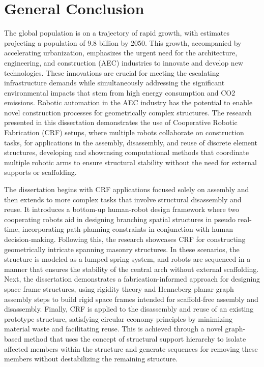     \section{General Conclusion}
        The global population is on a trajectory of rapid growth, with estimates projecting a population of 9.8 billion by 2050. This growth, accompanied by accelerating urbanization, emphasizes the urgent need for the architecture, engineering, and construction (AEC) industries to innovate and develop new technologies. These innovations are crucial for meeting the escalating infrastructure demands while simultaneously addressing the significant environmental impacts that stem from high energy consumption and CO2 emissions. Robotic automation in the AEC industry has the potential to enable novel construction processes for geometrically complex structures. The research presented in this dissertation demonstrates the use of Cooperative Robotic Fabrication (CRF) setups, where multiple robots collaborate on construction tasks, for applications in the assembly, disassembly, and reuse of discrete element structures, developing and showcasing computational methods that coordinate multiple robotic arms to ensure structural stability without the need for external supports or scaffolding.
        
        The dissertation begins with CRF applications focused solely on assembly and then extends to more complex tasks that involve structural disassembly and reuse. It introduces a bottom-up human-robot design framework where two cooperating robots aid in designing branching spatial structures in pseudo real-time, incorporating path-planning constraints in conjunction with human decision-making. Following this, the research showcases CRF for constructing geometrically intricate spanning masonry structures. In these scenarios, the structure is modeled as a lumped spring system, and robots are sequenced in a manner that ensures the stability of the central arch without external scaffolding. Next, the dissertation  demonstrates a fabrication-informed approach for designing space frame structures, using rigidity theory and Henneberg planar graph assembly steps to build rigid space frames intended for scaffold-free assembly and disassembly. Finally, CRF is applied to the disassembly and reuse of an existing prototype structure, satisfying circular economy principles by minimizing material waste and facilitating reuse. This is achieved through a novel graph-based method that uses the concept of structural support hierarchy to isolate affected members within the structure and generate sequences for removing these members without destabilizing the remaining structure.
        
